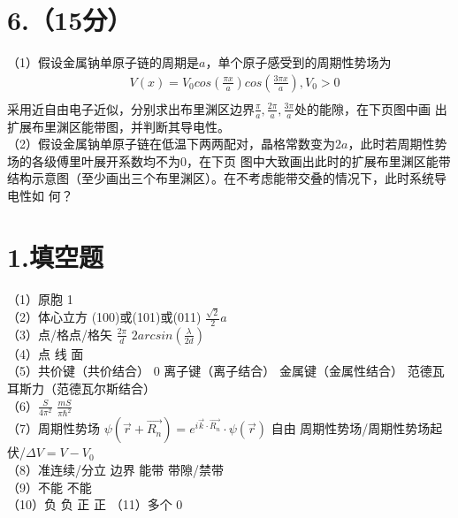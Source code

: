 \documentclass[UTF8]{ctexart}
\begin{document}
\section*{\bfseries 6.（15分）}
（1）假设金属钠单原子链的周期是$a$，单个原子感受到的周期性势场为
\begin{equation*}
    \begin{aligned}
        &V(x)=V_0cos(\frac{\pi x}{a})cos(\frac{3\pi x}{a}),V_0>0\\
    \end{aligned}
\end{equation*}
采用近自由电子近似，分别求出布里渊区边界$\frac{\pi}{a},\frac{2\pi}{a},\frac{3\pi}{a}$处的能隙，在下页图中画
出扩展布里渊区能带图，并判断其导电性。\\
（2）假设金属钠单原子链在低温下两两配对，晶格常数变为$2a$，此时若周期性势场的各级傅里叶展开系数均不为0，在下页
图中大致画出此时的扩展布里渊区能带结构示意图（至少画出三个布里渊区）。在不考虑能带交叠的情况下，此时系统导电性如
何？














\newpage
\section*{\bfseries 1.填空题}
（1）原胞\makebox[2em]{}
1\\
（2）体心立方\makebox[2em]{}
(100)或(101)或(011)\makebox[2em]{}
$\frac{\sqrt2}{2}a$\\
（3）点/格点/格矢\makebox[2em]{}
$\frac{2\pi}{d}$\makebox[2em]{}
$2arcsin(\frac{\lambda}{2d})$\\
（4）点\makebox[2em]{}
线\makebox[2em]{}
面\\
（5）共价键（共价结合）\makebox[2em]{}
0\makebox[2em]{}
离子键（离子结合）\makebox[2em]{}
金属键（金属性结合）\makebox[2em]{}
范德瓦耳斯力（范德瓦尔斯结合）\\
（6）$\frac{S}{4\pi^2}$\makebox[2em]{}
$\frac{mS}{\pi\hbar^2}$\\
（7）周期性势场\makebox[2em]{}
$\psi(\vec{r}+\vec{R_n})=e^{i\vec{k}\cdot\vec{R_n}}\cdot\psi(\vec{r})$\makebox[2em]{}
自由\makebox[2em]{}
周期性势场/周期性势场起伏/$\Delta V=V-V_0$\\
（8）准连续/分立\makebox[2em]{}
边界\makebox[2em]{}
能带\makebox[2em]{}
带隙/禁带\\
（9）不能\makebox[2em]{}
不能\\
（10）负\makebox[2em]{}
负\makebox[2em]{}
正\makebox[2em]{}
正\makebox[2em]{}
（11）多个\makebox[2em]{}
0\\
\end{document}
